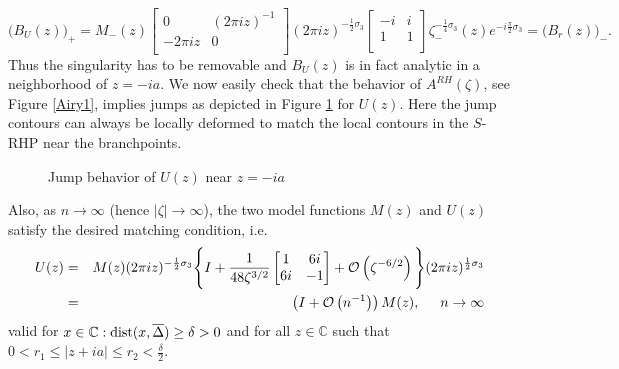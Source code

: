 \documentclass[10pt,oneside,reqno]{amsart}
\numberwithin{equation}{section}
\begin{document}
\begin{equation*}
  \big(B_U(z)\big)_+ = M_-(z)\begin{bmatrix}
                                          0 & (2\pi iz)^{-1}\\
-2\pi iz & 0\\
                                         \end{bmatrix}(2\pi iz)^{-\frac{1}{2}\sigma_3}\begin{bmatrix}
-i & i\\
1 & 1\\
\end{bmatrix}\zeta_-^{-\frac{1}{4}\sigma_3}(z)e^{-i\frac{\pi}{2}\sigma_3}=\big(B_r(z)\big)_-.
\end{equation*}
Thus the singularity has to be removable and $B_U(z)$ is in fact analytic in a neighborhood of $z=-ia$. We now easily check that the behavior of $A^{RH}(\zeta)$, see Figure
\ref{Airy1}, implies jumps as depicted in Figure \ref{Upara} for $U(z)$. Here the jump contours can always be locally deformed to match the local contours in the $S$-RHP
near the branchpoints.
\begin{figure}[tbh]
\begin{flushleft}
\hspace{2.5cm}\resizebox{0.4\textwidth}{!}{}
\caption{Jump behavior of $U(z)$ near $z=-ia$}
\label{Upara}
\end{flushleft}
\end{figure}

Also, as $n\rightarrow\infty$ (hence $|\zeta|\rightarrow\infty$), the two model functions $M(z)$ and $U(z)$ satisfy the desired matching condition, i.e.
\begin{eqnarray}
  U(z) &=& M(z)(2\pi iz)^{-\frac{1}{2}\sigma_3}\Bigg\{I+\frac{1}{48\zeta^{3/2}}\begin{bmatrix}
	1 & 6i\\
	6i & -1\\
	\end{bmatrix}+\mathcal O\left(\zeta^{-6/2}\right)\Bigg\}(2\pi iz)^{\frac{1}{2}\sigma_3}\nonumber\\
& =& \left(I+\mathcal O\left(n^{-1}\right)\right)M(z),\hspace{0.5cm}n\rightarrow\infty\label{match1}
\end{eqnarray}
valid for $x\in\mathbb{C}:\textnormal{dist}(x,\overline{\Delta})\geq\delta>0$ and for all $z\in\mathbb{C}$ such that $0<r_1\leq|z+ia|\leq r_2<\frac{\delta}{2}$.\bigskip
\end{document}
